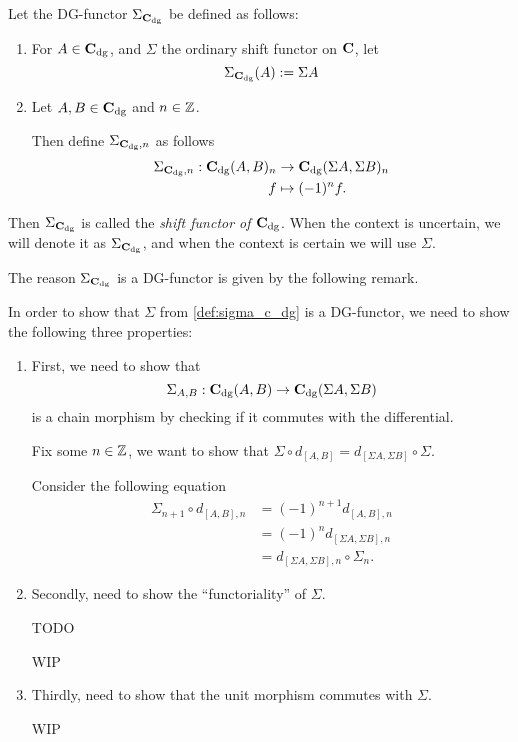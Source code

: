 \begin{definition}[Shift in \( \C_{\dg} \)]
    \label{def:sigma_c_dg}
    Let the DG-functor \( \Sigma_{\operatorname{\mathbf{C}}_{\operatorname{dg}}} \) be defined as follows:
    \begin{enumerate}
        \item {
            For \( A \in \operatorname{\mathbf{C}}_{\operatorname{dg}} \), and \( \Sigma \) the ordinary shift functor on \( \operatorname{\mathbf{C}} \), let
            \[
                \Sigma_{\operatorname{\mathbf{C}}_{\operatorname{dg}}}(A) := \Sigma A
            \]
        }
        \item {
            Let \( A, B \in \operatorname{\mathbf{C}}_{\operatorname{dg}} \) and \( n \in {\mathbb{Z}} \).

            Then define \( \Sigma_{\operatorname{\mathbf{C}}_{\operatorname{dg}}, n} \) as follows
            \begin{align*}
                \Sigma_{\operatorname{\mathbf{C}}_{\operatorname{dg}}, n}: \operatorname{\mathbf{C}}_{\operatorname{dg}}(A, B)_n &\to \operatorname{\mathbf{C}}_{\operatorname{dg}}(\Sigma A, \Sigma B)_n \\
                f &\mapsto (-1)^n f.
            \end{align*}
        }
    \end{enumerate}
    Then \( \Sigma_{\operatorname{\mathbf{C}}_{\operatorname{dg}}} \) is called the \emph{shift functor of \( \C_{\dg} \)}. When the context is uncertain, we will denote it as \( \Sigma_{\operatorname{\mathbf{C}}_{\operatorname{dg}}} \), and when the context is certain we will use \( \Sigma \).
\end{definition}

The reason \( \Sigma_{\operatorname{\mathbf{C}}_{\operatorname{dg}}} \) is a DG-functor is given by the following remark. 

\begin{remark}
    In order to show that \( \Sigma \) from \autoref{def:sigma_c_dg} is a DG-functor, we need to show the following three properties:
    \begin{enumerate}
        \item {
            First, we need to show that
            \[
                \Sigma_{A, B}: \operatorname{\mathbf{C}}_{\operatorname{dg}}(A, B) \to \operatorname{\mathbf{C}}_{\operatorname{dg}}(\Sigma A, \Sigma B)
            \]
            is a chain morphism by checking if it commutes with the differential.

            Fix some \( n \in {\mathbb{Z}} \), we want to show that \( \Sigma \circ d_{[A, B]} = d_{[\Sigma A, \Sigma B]} \circ \Sigma \).

            Consider the following equation
            \begin{align*}
                \Sigma_{n + 1} \circ d_{[A, B], n} &= (-1)^{n + 1} d_{[A, B], n} \\
                &= (-1)^n d_{[\Sigma A, \Sigma B], n} \\
                &= d_{[\Sigma A, \Sigma B], n} \circ \Sigma_n.
            \end{align*}
        }
        \item {
            Secondly, need to show the ``functoriality'' of \( \Sigma \).

            TODO

            WIP
        }
        \item {
            Thirdly, need to show that the unit morphism commutes with \( \Sigma \).

            WIP
        }
    \end{enumerate}
\end{remark}

